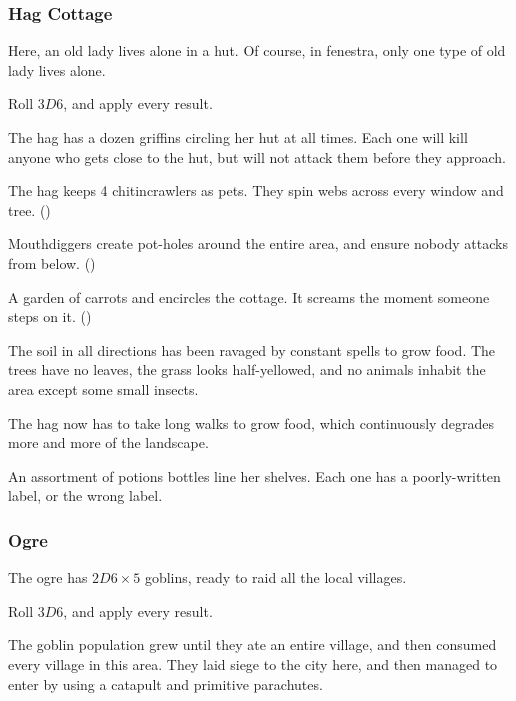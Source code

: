 \begin{multicols}{2}
\subsubsection{Hag Cottage}
\label{hagPoint}

Here, an old lady lives alone in a hut.
Of course, in \gls{fenestra}, only one type of old lady lives alone.

Roll $3D6$, and apply every result.

\begin{dlist}
  \item
  The hag has a dozen griffins circling her hut at all times.
  Each one will kill anyone who gets close to the hut, but will not attack them before they approach.
  \item
  The hag keeps 4 chitincrawlers as pets.
  They spin webs across every window and tree.
  ()
  \item
  Mouthdiggers create pot-holes around the entire area, and ensure nobody attacks from below.
  ()
  \item
  A garden of carrots and  encircles the cottage.
  It screams the moment someone steps on it.
  ()
  \item
  The soil in all directions has been ravaged by constant spells to grow food.
  The trees have no leaves, the grass looks half-yellowed, and no animals inhabit the area except some small insects.

  The hag now has to take long walks to grow food, which continuously degrades more and more of the landscape.
  \item
  An assortment of potions bottles line her shelves.
  Each one has a poorly-written label, or the wrong label.
\end{dlist}

\subsubsection{Ogre}
\label{ogrePoint}

The ogre has $2D6 \times 5$ goblins, ready to raid all the local \glspl{village}.

Roll $3D6$, and apply every result.

\begin{dlist}
  \item
  The goblin population grew until they ate an entire \gls{village}, and then consumed every \gls{village} in this area.
  They laid siege to the city here, and then managed to enter by using a catapult and primitive parachutes.


\end{dlist}
\end{multicols}
